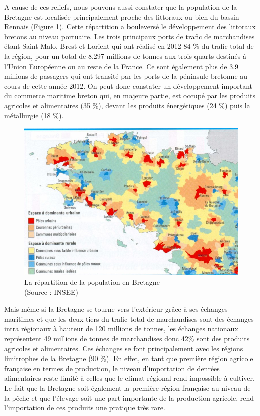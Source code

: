 \documentclass[a4paper,12pt]{report}
\begin{document}
			A cause de ces reliefs, nous pouvons aussi constater que la population de la Bretagne est localisée principalement proche des littoraux ou bien du bassin Rennais (Figure \ref{DensitePopulationBretagne}). Cette répartition a bouleversé le développement des littoraux bretons au niveau portuaire. Les trois principaux ports de trafic de marchandises étant Saint-Malo, Brest et Lorient qui ont réalisé en 2012 84 \% du trafic total de la région, pour un total de 8.297 millions de tonnes aux trois quarts destinés à l’Union Européenne ou au reste de la France. Ce sont également plus de 3.9 millions de passagers qui ont transité par les ports de la péninsule bretonne au cours de cette année 2012\cite{CommerceMaritimeBretagne}. On peut donc constater un développement important du commerce maritime breton qui, en majeure partie, est occupé par les produits agricoles et alimentaires (35 \%), devant les produits énergétiques (24 \%) puis la métallurgie (18 \%).
			
			\begin{figure}[!h]
			\centering
			\includegraphics[scale=3.25]{Illustrations/DensitePopulationBretagne.jpg}
			\caption{La répartition de la population en Bretagne\\(Source : INSEE)}
			\label{DensitePopulationBretagne}
			\end{figure}						
			
			Mais même si la Bretagne se tourne vers l’extérieur grâce à ses échanges maritimes et que les deux tiers du trafic total de marchandises sont des échanges intra régionaux à hauteur de 120 millions de tonnes, les échanges nationaux représentent 49 millions de tonnes de marchandises donc 42\% sont des produits agricoles et alimentaires\cite{InfrastructureConnecterBretagneMondeCCI}. Ces échanges se font principalement avec les régions limitrophes de la Bretagne (90 \%). En effet, en tant que première région agricole française en termes de production, le niveau d’importation de denrées alimentaires reste limité à celles que le climat régional rend impossible à cultiver. Le fait que la Bretagne soit également la première région française au niveau de la pêche et que l’élevage soit une part importante de la production agricole, rend l’importation de ces produits une pratique très rare.
			
\end{document}
